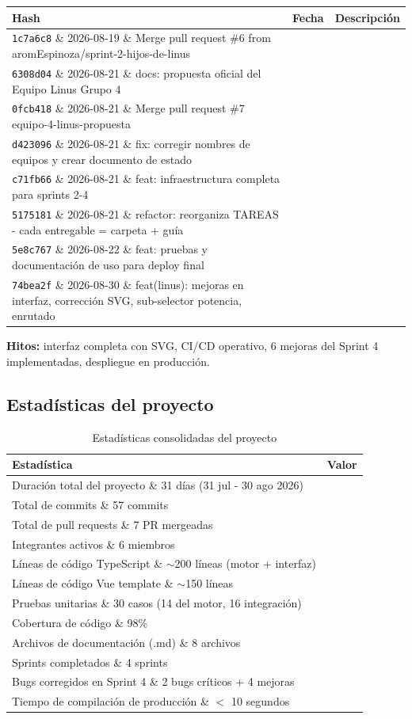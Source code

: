 \documentclass[11pt,a4paper]{article}
\begin{document}
\begin{table}[htbp]
\centering
\small
\begin{tabularx}{\textwidth}{llX}
\toprule
\textbf{Hash} & \textbf{Fecha} & \textbf{Descripción} \\
\midrule
\texttt{1c7a6c8} \& 2026-08-19 \& Merge pull request \#6 from aromEspinoza/sprint-2-hijos-de-linus \\
\texttt{6308d04} \& 2026-08-21 \& docs: propuesta oficial del Equipo Linus Grupo 4 \\
\texttt{0fcb418} \& 2026-08-21 \& Merge pull request \#7 equipo-4-linus-propuesta \\
\texttt{d423096} \& 2026-08-21 \& fix: corregir nombres de equipos y crear documento de estado \\
\texttt{c71fb66} \& 2026-08-21 \& feat: infraestructura completa para sprints 2-4 \\
\texttt{5175181} \& 2026-08-21 \& refactor: reorganiza TAREAS - cada entregable = carpeta + guía \\
\texttt{5e8c767} \& 2026-08-22 \& feat: pruebas y documentación de uso para deploy final \\
\texttt{74bea2f} \& 2026-08-30 \& feat(linus): mejoras en interfaz, corrección SVG, sub-selector potencia, enrutado \\
\bottomrule
\end{tabularx}
\end{table}
\textbf{Hitos:} interfaz completa con SVG, CI/CD operativo, 6 mejoras del Sprint 4 implementadas, despliegue en producción.

\subsection{Estadísticas del proyecto}
\begin{table}[htbp]
\centering
\caption{Estadísticas consolidadas del proyecto}
\begin{tabularx}{0.85\textwidth}{lX}
\toprule
\textbf{Estadística} & \textbf{Valor} \\
\midrule
Duración total del proyecto \& 31 días (31 jul - 30 ago 2026) \\
Total de commits \& 57 commits \\
Total de pull requests \& 7 PR mergeadas \\
Integrantes activos \& 6 miembros \\
Líneas de código TypeScript \& $\sim$200 líneas (motor + interfaz) \\
Líneas de código Vue template \& $\sim$150 líneas \\
Pruebas unitarias \& 30 casos (14 del motor, 16 integración) \\
Cobertura de código \& 98\% \\
Archivos de documentación (.md) \& 8 archivos \\
Sprints completados \& 4 sprints \\
Bugs corregidos en Sprint 4 \& 2 bugs críticos + 4 mejoras \\
Tiempo de compilación de producción \& $<$ 10 segundos \\
\bottomrule
\end{tabularx}
\end{table}
\end{document}
